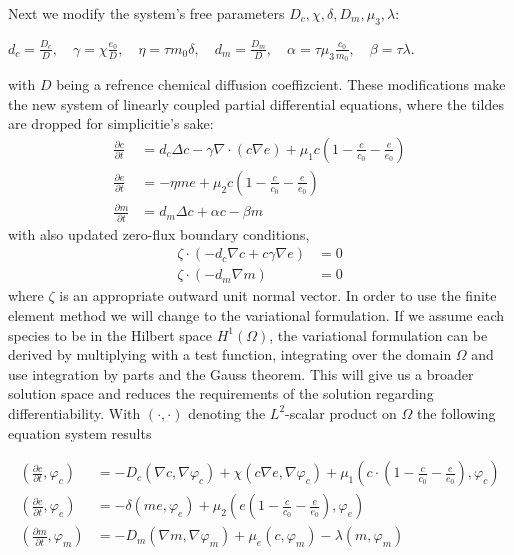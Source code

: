 Next we modify the system's free parameters $D_c, \chi, \delta, D_m, \mu_3, \lambda$: \newline 
\begin{center}
    $d_c = \frac{D_c}{D},\quad \gamma = \chi \frac{e_0}{D},\quad \eta = \tau m_0 \delta,\quad d_m = \frac{D_m}{D},\quad \alpha = \tau \mu_3 \frac{c_0}{m_0},\quad \beta = \tau \lambda$.
\end{center} 
with $D$ being a refrence chemical diffusion coeffizcient.\newline 
These modifications make the new system of linearly coupled partial differential equations, where the tildes are dropped for simplicitie's sake:
\begin{align}
	\frac{\partial c}{\partial t} &= d_c \Delta c - \gamma \nabla \cdot (c\nabla e)  + \mu_1 c\left(1-\frac{c}{c_0}-\frac{e}{e_0}\right)\\
	\frac{\partial e}{\partial t} &= -\eta m e  + \mu_2 c\left(1-\frac{c}{c_0}-\frac{e}{e_0}\right)\\
	\frac{\partial m}{\partial t} &= d_m \Delta c + \alpha c - \beta m
\end{align}
with also updated zero-flux boundary conditions, 
\begin{align}
	\zeta \cdot (-d_c \nabla c + c \gamma \nabla e) &= 0\\
	\zeta \cdot (-d_m\nabla m ) &= 0
\end{align}
where $\zeta$ is an appropriate outward unit normal vector.\newline 
In order to use the finite element method we will change to the variational formulation. If we assume each species to be in the Hilbert space $H^1(\Omega)$, the variational formulation can be derived by multiplying with a test function, integrating over the domain $\Omega$ and use integration by parts and the Gauss theorem. This will give us a broader solution space and reduces the requirements of the solution regarding differentiability. With $\left(\cdot, \cdot\right)$ denoting the $L^2$-scalar product on $\Omega$ the following equation system results

\begin{align}
    \left(\frac{\partial c}{\partial t}, \varphi_c\right) &=
        - D_c\left(\nabla c, \nabla \varphi_c\right) + \chi \left(c\nabla e, \nabla \varphi_c\right) + \mu_1 \left(c \cdot \left(1-\frac{c}{c_0} - \frac{e}{e_0}\right), \varphi_c\right)     \\
    \left(\frac{\partial e}{\partial t}, \varphi_e\right) &=  -\delta \left( me, \varphi_e\right) + \mu_2 \left(e\left(1-\frac{c}{c_0}-\frac{e}{e_0}\right),\varphi_e\right) \\
    \left(\frac{\partial m}{\partial t}, \varphi_m\right) &= -D_m \left(\nabla m,\nabla \varphi_m\right) + \mu_e \left(c,\varphi_m\right) - \lambda \left(m,\varphi_m\right) 
\end{align}


